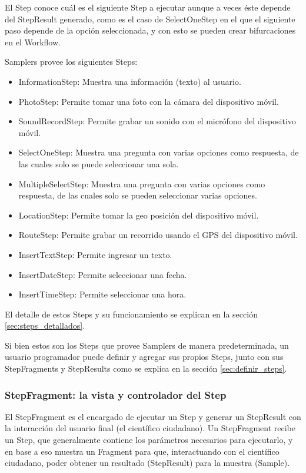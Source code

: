 El Step conoce cuál es el siguiente Step a ejecutar aunque a veces éste depende del StepResult generado, como es el caso de SelectOneStep en el que el siguiente paso depende de la opción seleccionada, y con esto se pueden crear bifurcaciones en el Workflow.

Samplers provee los siguientes Steps:
\begin{itemize}
	\item InformationStep: Muestra una información (texto) al usuario.
	\item PhotoStep: Permite tomar una foto con la cámara del dispositivo móvil.
	\item SoundRecordStep: Permite grabar un sonido con el micrófono del dispositivo móvil.
	\item SelectOneStep: Muestra una pregunta con varias opciones como respuesta, de las cuales solo se puede seleccionar una sola.
	\item MultipleSelectStep: Muestra una pregunta con varias opciones como respuesta, de las cuales solo se pueden seleccionar varias opciones.
	\item LocationStep: Permite tomar la geo posición del dispositivo móvil.
	\item RouteStep: Permite grabar un recorrido usando el GPS del dispositivo móvil.
	\item InsertTextStep: Permite ingresar un texto.
	\item InsertDateStep: Permite seleccionar una fecha.
	\item InsertTimeStep: Permite seleccionar una hora.
\end{itemize}

El detalle de estos Steps y su funcionamiento se explican en la sección \ref{sec:steps_detallados}.

Si bien estos son los Steps que provee Samplers de manera predeterminada, un usuario programador puede definir y agregar sus propios Steps, junto con sus StepFragments y StepResults como se explica en la sección \ref{sec:definir_steps}.

\subsubsection{StepFragment: la vista y controlador del Step}
El StepFragment es el encargado de ejecutar un Step y generar un StepResult con la interacción del usuario final (el científico ciudadano). Un StepFragment recibe un Step, que generalmente contiene los parámetros necesarios para ejecutarlo, y en base a eso muestra un Fragment para que, interactuando con el científico ciudadano, poder obtener un resultado (StepResult) para la muestra (Sample). 

